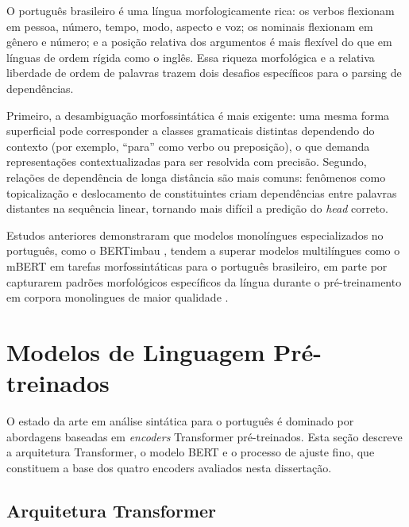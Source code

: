 O português brasileiro é uma língua morfologicamente rica: os verbos flexionam em pessoa,
número, tempo, modo, aspecto e voz; os nominais flexionam em gênero e número; e a posição
relativa dos argumentos é mais flexível do que em línguas de ordem rígida como o inglês.
Essa riqueza morfológica e a relativa liberdade de ordem de palavras trazem dois desafios
específicos para o parsing de dependências.

Primeiro, a desambiguação morfossintática é mais exigente: uma mesma forma superficial pode
corresponder a classes gramaticais distintas dependendo do contexto (por exemplo, ``para''
como verbo ou preposição), o que demanda representações contextualizadas para ser resolvida
com precisão. Segundo, relações de dependência de longa distância são mais comuns: fenômenos
como topicalização e deslocamento de constituintes criam dependências entre palavras distantes
na sequência linear, tornando mais difícil a predição do \textit{head} correto.

Estudos anteriores demonstraram que modelos monolíngues especializados no português, como o
BERTimbau \cite{souza2020bertimbau}, tendem a superar modelos multilíngues como o mBERT
\cite{devlin2019bert} em tarefas morfossintáticas para o português brasileiro, em parte por
capturarem padrões morfológicos específicos da língua durante o pré-treinamento em corpora
monolingues de maior qualidade \cite{lopes2024towards}.

\section{Modelos de Linguagem Pré-treinados}
\label{sec:llm}

O estado da arte em análise sintática para o português é dominado por abordagens baseadas em
\textit{encoders} Transformer pré-treinados. Esta seção descreve a arquitetura Transformer,
o modelo BERT e o processo de ajuste fino, que constituem a base dos quatro encoders avaliados
nesta dissertação.

\subsection{Arquitetura Transformer}
\label{subsec:transformer}

